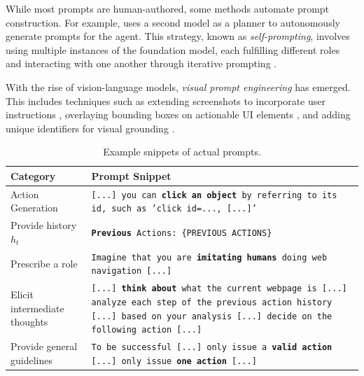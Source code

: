 While most prompts are human-authored, some methods automate prompt construction.
For example, \citet{sun_adaplanner_2023} uses a second model as a planner to autonomously generate prompts for the agent.
This strategy, known as \emph{self-prompting}, involves using multiple instances of the foundation model, each fulfilling different roles and interacting with one another through iterative prompting .

With the rise of vision-language models, \emph{visual prompt engineering} has emerged. This includes techniques such as extending screenshots to incorporate user instructions \citep{lee_pix2struct_2023}, overlaying bounding boxes on actionable UI elements , and adding unique identifiers for visual grounding .

\begin{table}

    \caption{Example snippets of actual prompts.}
    \label{tab:in-context-learning}
     {\footnotesize
    \begin{tabular}{>{\raggedright\arraybackslash}p{3.5cm} >{\raggedright\arraybackslash}p{10cm}}
        \toprule
        \textbf{Category} & \textbf{Prompt Snippet} \\
        \midrule
        Action Generation & \texttt{[...] you can \textbf{click an object} by referring to its id, such as 'click id=..., [...]'} \citep{li_zero-shot_2023} \\ 
        Provide history $h_t$ &  \texttt{\textbf{Previous} Actions: \{PREVIOUS ACTIONS\}} \citep{zheng_gpt-4vision_2024} \\ 
        Prescribe a role & \texttt{Imagine that you are \textbf{imitating humans} doing web navigation [...]} \citep{zheng_gpt-4vision_2024} \\ 
        Elicit intermediate thoughts & \texttt{[...] \textbf{think about} what the current webpage is [...] analyze each step of the previous action history [...] based on your analysis [...] decide on the following action [...]} \citep{zheng_gpt-4vision_2024} \\ 
        Provide general guidelines & \texttt{To be successful [...] only issue a \textbf{valid action} [...] only issue \textbf{one action} [...]} \citep{zheng_gpt-4vision_2024} \\
        \bottomrule
    \end{tabular}
    }
\end{table}

